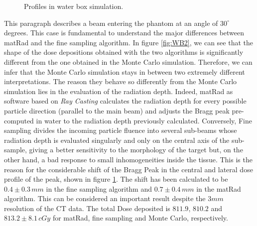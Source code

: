 \documentclass[12pt, a4paper, twoside]{book}
\begin{document}
\begin{figure}[!b]
\centering
{}\quad
{}\quad
{}\quad
\caption{Profiles in water box simulation.}
\label{fig:WB2prof}
\end{figure}

This paragraph describes a beam entering the phantom at an angle of $30^\circ$ degrees. This case is fundamental to understand the major differences between matRad and the fine sampling algorithm. In figure \ref{fig:WB2}, we can see that the shape of the dose depositions obtained with the two algorithms is significantly different from the one obtained in the Monte Carlo simulation. Therefore, we can infer that the Monte Carlo simulation stays in between two extremely different interpretations.
The reason they behave so differently from the Monte Carlo simulation lies in the evaluation of the radiation depth. Indeed, matRad as software based on \emph{Ray Casting} calculates the radiation depth for every possible particle direction (parallel to the main beam) and adjusts the Bragg peak pre-computed in water to the radiation depth previously calculated. Conversely, Fine sampling divides the incoming particle fluence into several sub-beams whose radiation depth is evaluated singularly and only on the central axis of the sub-sample, giving a better sensitivity to the morphology of the target but, on the other hand, a bad response to small inhomogeneities inside the tissue.
This is the reason for the considerable shift of the Bragg Peak in the central and lateral dose profile of the peak, shown in figure \ref{fig:WB2prof}. The shift has been calculated to be $0.4\pm0.3\,mm$ in the fine sampling algorithm and $0.7\pm0.4\,mm$ in the matRad algorithm. This can be considered an important result despite the $3mm$ resolution of the CT data.
The total Dose deposited is $811.9$, $810.2$ and $813.2\pm8.1\,cGy$ for matRad, fine sampling and Monte Carlo, respectively.
\end{document}
